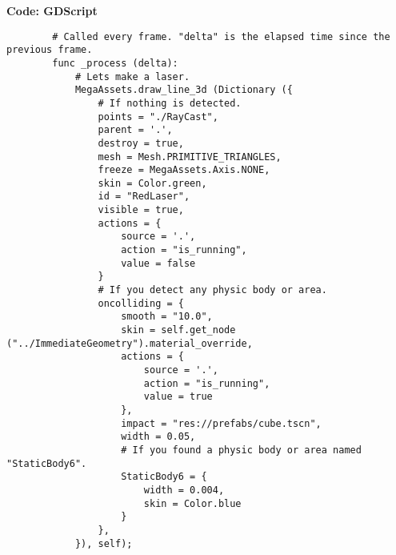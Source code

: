 \documentclass[a4paper, 11pt]{article}
\begin{document}
	\textbf{Code: GDScript}
	\begin{lstlisting}
		# Called every frame. "delta" is the elapsed time since the previous frame.
		func _process (delta):
			# Lets make a laser.
			MegaAssets.draw_line_3d (Dictionary ({
				# If nothing is detected.
				points = "./RayCast",
				parent = '.',
				destroy = true,
				mesh = Mesh.PRIMITIVE_TRIANGLES,
				freeze = MegaAssets.Axis.NONE,
				skin = Color.green,
				id = "RedLaser",
				visible = true,
				actions = {
					source = '.',
					action = "is_running",
					value = false
				}
				# If you detect any physic body or area.
				oncolliding = {
					smooth = "10.0",
					skin = self.get_node ("../ImmediateGeometry").material_override,
					actions = {
						source = '.',
						action = "is_running",
						value = true
					},
					impact = "res://prefabs/cube.tscn",
					width = 0.05,
					# If you found a physic body or area named "StaticBody6".
					StaticBody6 = {
						width = 0.004,
						skin = Color.blue
					}
				},
			}), self);
	\end{lstlisting}
\end{document}
